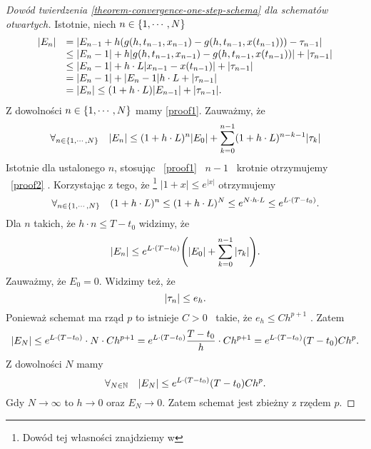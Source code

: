 \documentclass[12pt,a4paper]{report}
\begin{document}
\begin{proof}[Dowód twierdzenia \ref{theorem-convergence-one-step-schema} dla schematów otwartych]
Istotnie, niech $n \in \left\lbrace {1,\cdots,N} \right\rbrace $ 
\begin{equation}
\begin{array}{rl}
{\left| {E_n} \right|} &= {\left| {E_{n-1} + h(g(h,t_{n-1},x_{n-1}) - g(h,t_{n-1},x(t_{n-1}))) - \tau_{n-1}} \right|} \\
&\leq {\left| {E_n-1} \right|} + h {\left| {g(h,t_{n-1},x_{n-1}) - g(h,t_{n-1},x(t_{n-1}))} \right|} + {\left| { \tau_{n-1}} \right|}\\
&\leq {\left| {E_n-1} \right|} + h \cdot L {\left| {x_{n-1} - x(t_{n-1})} \right|} + {\left| { \tau_{n-1}} \right|}\\
&= {\left| {E_n-1} \right|} + {\left| {E_n-1} \right|} h \cdot L + {\left| { \tau_{n-1}} \right|}\\
&= {\left| {E_n} \right|} \leq (1 + h \cdot L) {\left| {E_{n-1}} \right|} + {\left| {\tau_{n-1}} \right|} .
\end{array}
\end{equation}
Z dowolności $n \in \left\lbrace {1, \cdots, N} \right\rbrace$ mamy \eqref{proof1}. 
Zauważmy, że 
\begin{equation} \label{proof2}
\forall_{n \in \set{1,\cdots,N}} \quad \abs{E_n} \leq (1 + h \cdot L)^{n} \abs{E_0} + \sum_{k=0}^{n-1} (1+ h \cdot L)^{n-k-1} \abs{\tau_k} 
\end{equation}
Istotnie dla ustalonego $n$, stosując \  \eqref{proof1} \  $n-1$ \  krotnie otrzymujemy \ \eqref{proof2} . Korzystając z tego, że \footnote{Dowód tej własności znajdziemy w} $|1+x|\leqslant e^{|x|}$ otrzymujemy
$$
\forall_{n \in \left\lbrace {1,\cdots,N} \right\rbrace} \quad (1 + h \cdot L)^{n} \leq (1 + h \cdot L)^{N} \leq e^{N \cdot h \cdot L} \leq e^{L \cdot (T-t_0)} .
$$
Dla $n$ takich, że $h\cdot n\leq  T - t_0 $ widzimy, że
$$
\abs{E_n} \leq e^{L \cdot (T-t_0)} \bracket{\abs{E_0} + \sum_{k=0}^{n-1}\abs{\tau_k}}.
$$
Zauważmy, że $E_0 = 0$. Widzimy też, że 
$$
{\left| {\tau_n} \right|} \leq e_h.
$$
Ponieważ schemat ma rząd $p$ to istnieje  $C>0$ \ takie, że $e_h \leq Ch^{p+1} $ . Zatem
$$
{\left| {E_N} \right|} \leq  e^{L \cdot (T-t_0)} \cdot N \cdot Ch^{p+1}
= e^{L \cdot (T-t_0)} \frac{T-t_0}{h} \cdot Ch^{p+1}
= e^{L \cdot (T-t_0)} (T-t_0) Ch^p.
$$
Z dowolności $N$ mamy
$$
\forall_{N \in \mathbb{N}} \quad {\left| {E_N} \right|} \leq e^{L \cdot (T-t_0)} (T-t_0) Ch^p.
$$
Gdy $ N \to \infty $ to $ h \to 0 $ oraz $ E_N \to 0$. Zatem schemat jest zbieżny z rzędem $p$.
\end{proof}
\end{document}
